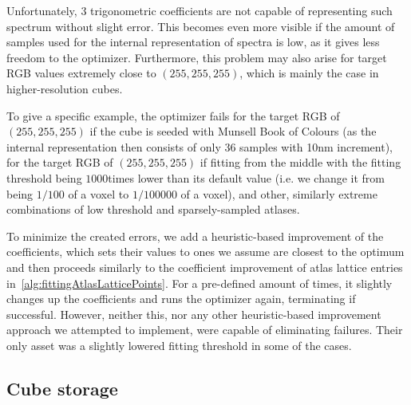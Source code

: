Unfortunately, 3 trigonometric coefficients are not capable of representing such spectrum without slight error. This becomes even more visible if the amount of samples used for the internal representation of spectra is low, as it gives less freedom to the optimizer. Furthermore, this problem may also arise for target RGB values extremely close to $(255, 255, 255)$, which is mainly the case in higher-resolution cubes.

To give a specific example, the optimizer fails for the target RGB of $(255, 255, 255)$ if the cube is seeded with Munsell Book of Colours (as the internal representation then consists of only 36 samples with 10nm increment), for the target RGB of $(255, 255, 255)$ if fitting from the middle with the fitting threshold being $1000$times lower than its default value (i.e. we change it from being $1/100$ of a voxel to $1/100000$ of a voxel), and other, similarly extreme combinations of low threshold and sparsely-sampled atlases.

To minimize the created errors, we add a heuristic-based improvement of the coefficients, which sets their values to ones we assume are closest to the optimum and then proceeds similarly to the coefficient improvement of atlas lattice entries in~\cref{alg:fittingAtlasLatticePoints}. For a pre-defined amount of times, it slightly changes up the coefficients and runs the optimizer again, terminating if successful. However, neither this, nor any other heuristic-based improvement approach we attempted to implement, were capable of eliminating failures. Their only asset was a slightly lowered fitting threshold in some of the cases.

\subsection{Cube storage}
	

